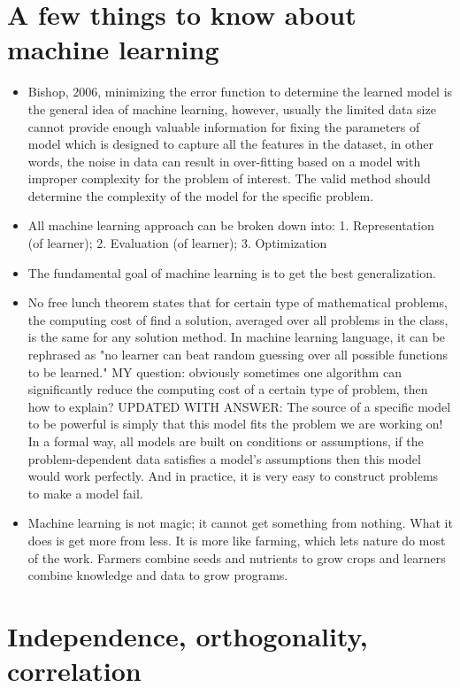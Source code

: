 \documentclass[paper=a4, fontsize=12pt]{scrartcl}	%
\numberwithin{equation}{section}					%
\numberwithin{figure}{section}					%
\numberwithin{table}{section}					%
\begin{document}
\section{A few things to know about machine learning}
\begin{itemize}
\item Bishop, 2006, minimizing the error function to determine the learned model is the general idea of machine learning, however, usually the limited data size cannot provide enough valuable information for fixing the parameters of model which is designed to capture all the features in the dataset, in other words, the noise in data can result in over-fitting based on a model with improper complexity for the problem of interest. The valid method should determine the complexity of the model for the specific problem. 
\item All machine learning approach can be broken down into: 1. Representation (of learner); 2. Evaluation (of learner); 3. Optimization
\item The fundamental goal of machine learning is to get the best generalization.
\item No free lunch theorem states that for certain type of mathematical problems, the computing cost of find a solution, averaged over all problems in the class, is the same for any solution method. In machine learning language, it can be rephrased as "no learner can beat random guessing over all possible functions to be learned." MY question: obviously sometimes one algorithm can significantly reduce the computing cost of a certain type of problem, then how to explain?
\subitem UPDATED WITH ANSWER: The source of a specific model to be powerful is simply that this model fits the problem we are working on! In a formal way, all models are built on conditions or assumptions, if the problem-dependent data satisfies a model's assumptions then this model would work perfectly. And in practice, it is very easy to construct problems to make a model fail. 

\item Machine learning is not magic; it cannot get something from nothing. What it does is get more from less. It is more like farming, which lets nature do most of the work. Farmers combine seeds and nutrients to grow crops and learners combine knowledge and data to grow programs.  
\end{itemize}



\section{Independence, orthogonality, correlation}
\end{document}
